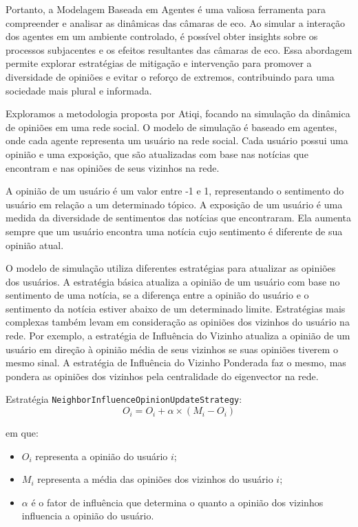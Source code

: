 Portanto, a Modelagem Baseada em Agentes é uma valiosa ferramenta para compreender e analisar as dinâmicas das câmaras de eco. Ao simular a interação dos agentes em um ambiente controlado, é possível obter insights sobre os processos subjacentes e os efeitos resultantes das câmaras de eco. Essa abordagem permite explorar estratégias de mitigação e intervenção para promover a diversidade de opiniões e evitar o reforço de extremos, contribuindo para uma sociedade mais plural e informada.

Exploramos a metodologia proposta por Atiqi, focando na simulação da dinâmica de opiniões em uma rede social. O modelo de simulação é baseado em agentes, onde cada agente representa um usuário na rede social. Cada usuário possui uma opinião e uma exposição, que são atualizadas com base nas notícias que encontram e nas opiniões de seus vizinhos na rede.

A opinião de um usuário é um valor entre -1 e 1, representando o sentimento do usuário em relação a um determinado tópico. A exposição de um usuário é uma medida da diversidade de sentimentos das notícias que encontraram. Ela aumenta sempre que um usuário encontra uma notícia cujo sentimento é diferente de sua opinião atual.

O modelo de simulação utiliza diferentes estratégias para atualizar as opiniões dos usuários. A estratégia básica atualiza a opinião de um usuário com base no sentimento de uma notícia, se a diferença entre a opinião do usuário e o sentimento da notícia estiver abaixo de um determinado limite. Estratégias mais complexas também levam em consideração as opiniões dos vizinhos do usuário na rede. Por exemplo, a estratégia de Influência do Vizinho atualiza a opinião de um usuário em direção à opinião média de seus vizinhos se suas opiniões tiverem o mesmo sinal. A estratégia de Influência do Vizinho Ponderada faz o mesmo, mas pondera as opiniões dos vizinhos pela centralidade do eigenvector na rede.

Estratégia \texttt{NeighborInfluenceOpinionUpdateStrategy}:
\begin{equation*}
	O_i = O_i + \alpha \times (M_i - O_i)
\end{equation*}

em que:

\begin{itemize}
	\item $O_i$ representa a opinião do usuário $i$;
	\item $M_i$ representa a média das opiniões dos vizinhos do usuário $i$;
	\item $\alpha$ é o fator de influência que determina o quanto a opinião dos vizinhos influencia a opinião do usuário.
\end{itemize}

